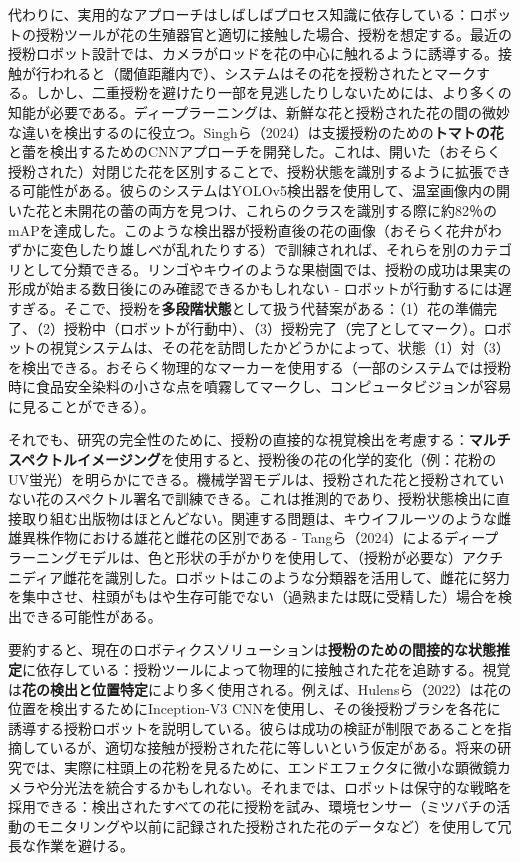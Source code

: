 \documentclass[a4paper,fleqn,10pt,twocolumn]{template_v1.0}
\begin{document}
代わりに、実用的なアプローチはしばしばプロセス知識に依存している：ロボットの授粉ツールが花の生殖器官と適切に接触した場合、授粉を想定する。最近の授粉ロボット設計では、カメラがロッドを花の中心に触れるように誘導する。接触が行われると（閾値距離内で）、システムはその花を授粉されたとマークする\cite{Hulens2022}\cite{Hulens2022a}。しかし、二重授粉を避けたり一部を見逃したりしないためには、より多くの知能が必要である。ディープラーニングは、新鮮な花と授粉された花の間の微妙な違いを検出するのに役立つ。Singhら（2024）は支援授粉のための\textbf{トマトの花}と蕾を検出するためのCNNアプローチを開発した。これは、開いた（おそらく授粉された）対閉じた花を区別することで、授粉状態を識別するように拡張できる可能性がある\cite{Singh2024}。彼らのシステムはYOLOv5検出器を使用して、温室画像内の開いた花と未開花の蕾の両方を見つけ、これらのクラスを識別する際に約82％のmAPを達成した\cite{Singh2024}。このような検出器が授粉直後の花の画像（おそらく花弁がわずかに変色したり雄しべが乱れたりする）で訓練されれば、それらを別のカテゴリとして分類できる。リンゴやキウイのような果樹園では、授粉の成功は果実の形成が始まる数日後にのみ確認できるかもしれない - ロボットが行動するには遅すぎる。そこで、授粉を\textbf{多段階状態}として扱う代替案がある：（1）花の準備完了、（2）授粉中（ロボットが行動中）、（3）授粉完了（完了としてマーク）。ロボットの視覚システムは、その花を訪問したかどうかによって、状態（1）対（3）を検出できる。おそらく物理的なマーカーを使用する（一部のシステムでは授粉時に食品安全染料の小さな点を噴霧してマークし、コンピュータビジョンが容易に見ることができる）。

それでも、研究の完全性のために、授粉の直接的な視覚検出を考慮する：\textbf{マルチスペクトルイメージング}を使用すると、授粉後の花の化学的変化（例：花粉のUV蛍光）を明らかにできる。機械学習モデルは、授粉された花と授粉されていない花のスペクトル署名で訓練できる。これは推測的であり、授粉状態検出に直接取り組む出版物はほとんどない。関連する問題は、キウイフルーツのような雌雄異株作物における雄花と雌花の区別である - Tangら（2024）によるディープラーニングモデルは、色と形状の手がかりを使用して、（授粉が必要な）アクチニディア雌花を識別した\cite{Tang2024}。ロボットはこのような分類器を活用して、雌花に努力を集中させ、柱頭がもはや生存可能でない（過熟または既に受精した）場合を検出できる可能性がある。

要約すると、現在のロボティクスソリューションは\textbf{授粉のための間接的な状態推定}に依存している：授粉ツールによって物理的に接触された花を追跡する。視覚は\textbf{花の検出と位置特定}により多く使用される。例えば、Hulensら（2022）は花の位置を検出するためにInception-V3 CNNを使用し、その後授粉ブラシを各花に誘導する授粉ロボットを説明している\cite{Hulens2022}。彼らは成功の検証が制限であることを指摘しているが、適切な接触が授粉された花に等しいという仮定がある。将来の研究では、実際に柱頭上の花粉を見るために、エンドエフェクタに微小な顕微鏡カメラや分光法を統合するかもしれない。それまでは、ロボットは保守的な戦略を採用できる：検出されたすべての花に授粉を試み、環境センサー（ミツバチの活動のモニタリングや以前に記録された授粉された花のデータなど）を使用して冗長な作業を避ける。
\end{document}
